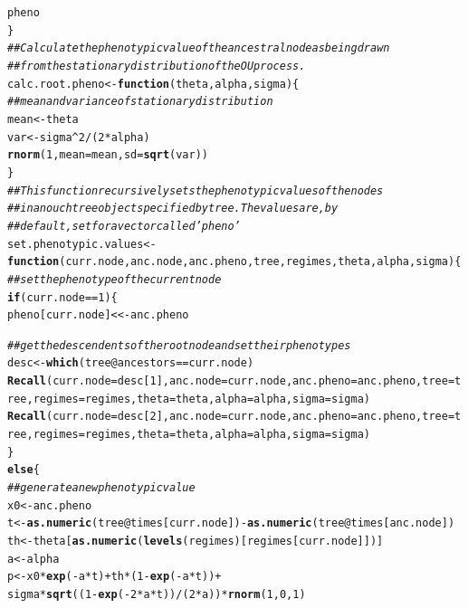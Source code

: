 \documentclass[12pt,reqno,final]{amsart}\usepackage[]{graphicx}\usepackage[]{color}
\makeatletter
\newcommand{\hlnum}[1]{\textcolor[rgb]{0.686,0.059,0.569}{#1}}%
\newcommand{\hlcom}[1]{\textcolor[rgb]{0.678,0.584,0.686}{\textit{#1}}}%
\newcommand{\hlopt}[1]{\textcolor[rgb]{0,0,0}{#1}}%
\newcommand{\hlstd}[1]{\textcolor[rgb]{0.345,0.345,0.345}{#1}}%
\newcommand{\hlkwa}[1]{\textcolor[rgb]{0.161,0.373,0.58}{\textbf{#1}}}%
\newcommand{\hlkwb}[1]{\textcolor[rgb]{0.69,0.353,0.396}{#1}}%
\newcommand{\hlkwc}[1]{\textcolor[rgb]{0.333,0.667,0.333}{#1}}%
\newcommand{\hlkwd}[1]{\textcolor[rgb]{0.737,0.353,0.396}{\textbf{#1}}}%
\newenvironment{kframe}{%
 \def\at@end@of@kframe{}%
 \ifinner\ifhmode%
  \def\at@end@of@kframe{\end{minipage}}%
  \begin{minipage}{\columnwidth}%
 \fi\fi%
 \def\FrameCommand##1{\hskip\@totalleftmargin \hskip-\fboxsep
 \colorbox{shadecolor}{##1}\hskip-\fboxsep
     \hskip-\linewidth \hskip-\@totalleftmargin \hskip\columnwidth}%
 \MakeFramed {\advance\hsize-\width
   \@totalleftmargin\z@ \linewidth\hsize
   \@setminipage}}%
 {\par\unskip\endMakeFramed%
 \at@end@of@kframe}
\newenvironment{knitrout}{}{} %
\theoremstyle{plain}
\numberwithin{equation}{part}
\makeatother
\begin{document}
\begin{knitrout}
\begin{kframe}
\begin{alltt}
  \hlstd{pheno}
\hlstd{\}}
\hlcom{## Calculate the phenotypic value of the ancestral node as being drawn}
\hlcom{## from the stationary distribution of the OU process.}
\hlstd{calc.root.pheno} \hlkwb{<-} \hlkwa{function}\hlstd{(}\hlkwc{theta}\hlstd{,} \hlkwc{alpha}\hlstd{,} \hlkwc{sigma}\hlstd{) \{}
  \hlcom{## mean and variance of stationary distribution}
  \hlstd{mean} \hlkwb{<-} \hlstd{theta}
  \hlstd{var} \hlkwb{<-} \hlstd{sigma}\hlopt{^}\hlnum{2}\hlopt{/}\hlstd{(}\hlnum{2}\hlopt{*}\hlstd{alpha)}
  \hlkwd{rnorm}\hlstd{(}\hlnum{1}\hlstd{,} \hlkwc{mean}\hlstd{=mean,} \hlkwc{sd}\hlstd{=}\hlkwd{sqrt}\hlstd{(var))}
\hlstd{\}}
\hlcom{## This function recursively sets the phenotypic values of the nodes}
\hlcom{## in an ouchtree object specified by tree.  The values are, by}
\hlcom{## default, set for a vector called 'pheno'}
\hlstd{set.phenotypic.values} \hlkwb{<-} \hlkwa{function}\hlstd{(}\hlkwc{curr.node}\hlstd{,} \hlkwc{anc.node}\hlstd{,} \hlkwc{anc.pheno}\hlstd{,} \hlkwc{tree}\hlstd{,} \hlkwc{regimes}\hlstd{,} \hlkwc{theta}\hlstd{,} \hlkwc{alpha}\hlstd{,} \hlkwc{sigma}\hlstd{) \{}
  \hlcom{## set the phenotype of the current node}
  \hlkwa{if} \hlstd{(curr.node} \hlopt{==} \hlnum{1}\hlstd{) \{}
    \hlstd{pheno[curr.node]} \hlkwb{<<-} \hlstd{anc.pheno}

    \hlcom{## get the descendents of the root node and set their phenotypes}
    \hlstd{desc} \hlkwb{<-} \hlkwd{which}\hlstd{(tree}\hlopt{@}\hlkwc{ancestors}\hlopt{==}\hlstd{curr.node)}
    \hlkwd{Recall}\hlstd{(}\hlkwc{curr.node}\hlstd{=desc[}\hlnum{1}\hlstd{],} \hlkwc{anc.node}\hlstd{=curr.node,} \hlkwc{anc.pheno}\hlstd{=anc.pheno,} \hlkwc{tree}\hlstd{=tree,} \hlkwc{regimes}\hlstd{=regimes,} \hlkwc{theta}\hlstd{=theta,} \hlkwc{alpha}\hlstd{=alpha,} \hlkwc{sigma}\hlstd{=sigma)}
    \hlkwd{Recall}\hlstd{(}\hlkwc{curr.node}\hlstd{=desc[}\hlnum{2}\hlstd{],} \hlkwc{anc.node}\hlstd{=curr.node,} \hlkwc{anc.pheno}\hlstd{=anc.pheno,} \hlkwc{tree}\hlstd{=tree,} \hlkwc{regimes}\hlstd{=regimes,} \hlkwc{theta}\hlstd{=theta,} \hlkwc{alpha}\hlstd{=alpha,} \hlkwc{sigma}\hlstd{=sigma)}
  \hlstd{\}}
  \hlkwa{else} \hlstd{\{}
    \hlcom{## generate a new phenotypic value}
    \hlstd{x0} \hlkwb{<-} \hlstd{anc.pheno}
    \hlstd{t} \hlkwb{<-} \hlkwd{as.numeric}\hlstd{(tree}\hlopt{@}\hlkwc{times}\hlstd{[curr.node])}\hlopt{-}\hlkwd{as.numeric}\hlstd{(tree}\hlopt{@}\hlkwc{times}\hlstd{[anc.node])}
    \hlstd{th} \hlkwb{<-} \hlstd{theta[}\hlkwd{as.numeric}\hlstd{(}\hlkwd{levels}\hlstd{(regimes)[regimes[curr.node]])]}
    \hlstd{a} \hlkwb{<-} \hlstd{alpha}
    \hlstd{p} \hlkwb{<-} \hlstd{x0}\hlopt{*}\hlkwd{exp}\hlstd{(}\hlopt{-}\hlstd{a}\hlopt{*}\hlstd{t)} \hlopt{+} \hlstd{th}\hlopt{*}\hlstd{(}\hlnum{1}\hlopt{-}\hlkwd{exp}\hlstd{(}\hlopt{-}\hlstd{a}\hlopt{*}\hlstd{t))} \hlopt{+}
      \hlstd{sigma}\hlopt{*}\hlkwd{sqrt}\hlstd{((}\hlnum{1}\hlopt{-}\hlkwd{exp}\hlstd{(}\hlopt{-}\hlnum{2}\hlopt{*}\hlstd{a}\hlopt{*}\hlstd{t))}\hlopt{/}\hlstd{(}\hlnum{2}\hlopt{*}\hlstd{a))}\hlopt{*}\hlkwd{rnorm}\hlstd{(}\hlnum{1}\hlstd{,} \hlnum{0}\hlstd{,} \hlnum{1}\hlstd{)}


\end{alltt}
\end{kframe}
\end{knitrout}
\end{document}
